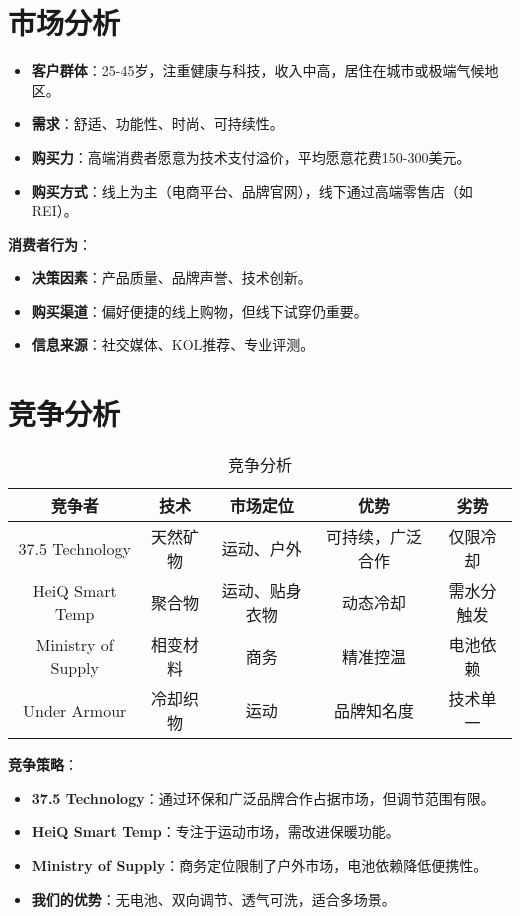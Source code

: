 \documentclass[UTF8]{report}
\theoremstyle{MyLineTheoremStyle} %
\theoremstyle{MyBlockTheoremStyle} %
\theoremstyle{MySubsubsectionStyle} %
\begin{document}
\section{市场分析}
\begin{itemize}
    \item \textbf{客户群体}：25-45岁，注重健康与科技，收入中高，居住在城市或极端气候地区。
    \item \textbf{需求}：舒适、功能性、时尚、可持续性。
    \item \textbf{购买力}：高端消费者愿意为技术支付溢价，平均愿意花费150-300美元。
    \item \textbf{购买方式}：线上为主（电商平台、品牌官网），线下通过高端零售店（如REI）。
\end{itemize}

\vspace{1em}
\noindent\textbf{消费者行为}：
\begin{itemize}[itemsep=1ex,leftmargin=*]
  \item \textbf{决策因素}：产品质量、品牌声誉、技术创新。
  \item \textbf{购买渠道}：偏好便捷的线上购物，但线下试穿仍重要。
  \item \textbf{信息来源}：社交媒体、KOL推荐、专业评测。
\end{itemize}

\section{竞争分析}
\begin{table}[h]
    \centering
    \begin{tabular}{|c|c|c|c|c|}
        \hline
        \textbf{竞争者} & \textbf{技术} & \textbf{市场定位} & \textbf{优势} & \textbf{劣势} \\
        \hline
        37.5 Technology & 天然矿物 & 运动、户外 & 可持续，广泛合作 & 仅限冷却 \\
        \hline
        HeiQ Smart Temp & 聚合物 & 运动、贴身衣物 & 动态冷却 & 需水分触发 \\
        \hline
        Ministry of Supply & 相变材料 & 商务 & 精准控温 & 电池依赖 \\
        \hline
        Under Armour & 冷却织物 & 运动 & 品牌知名度 & 技术单一 \\
        \hline
    \end{tabular}
    \caption{竞争分析}
\end{table}

\noindent\textbf{竞争策略}：
\begin{itemize}[itemsep=1ex,leftmargin=*]
  \item \textbf{37.5 Technology}：通过环保和广泛品牌合作占据市场，但调节范围有限。
  \item \textbf{HeiQ Smart Temp}：专注于运动市场，需改进保暖功能。
  \item \textbf{Ministry of Supply}：商务定位限制了户外市场，电池依赖降低便携性。
  \item \textbf{我们的优势}：无电池、双向调节、透气可洗，适合多场景。
\end{itemize}
\end{document}
